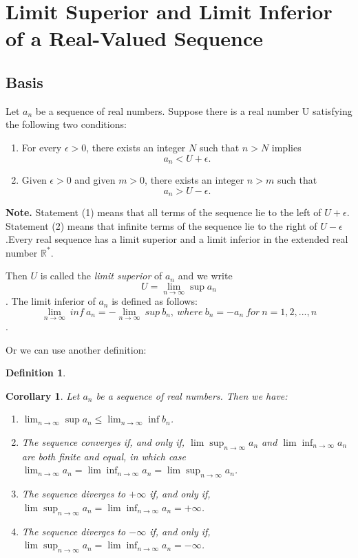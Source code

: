 \documentclass{article}
\newtheorem{corollary}[theorem]{Corollary}
\theoremstyle{definition}
\newtheorem{defi}{Definition}[section]
\begin{document}
\section{Limit Superior and Limit Inferior of a Real-Valued Sequence}
\subsection{Basis}
Let ${a_{n}}$ be a sequence of real numbers. Suppose there is a real number U 
satisfying the following two conditions:

\begin{enumerate}
    \item For every $\epsilon > 0$, there exists an integer $N$ such that $n>N$ 
    implies $$a_{n}<U+\epsilon.$$
    \item Given $\epsilon>0$ and given $m>0$, there exists an integer $n>m$ such that 
    $$a_{n}>U-\epsilon.$$ 
\end{enumerate}

\textbf{Note.} Statement (1) means that all terms of the sequence lie to the left 
of $U+\epsilon$. Statement (2) means that infinite terms of the sequence lie to the 
right of $U-\epsilon$.Every real sequence has a limit superior and a limit inferior 
in the extended real number $\mathbb{R^{*}}$.

Then $U$ is called the \textit{limit superior} of ${a_{n}}$
and we write $$U=\lim_{n\rightarrow \infty}\sup{a_{n}}$$.
The limit inferior of ${a_{n}}$ is defined as follows:
$$\lim_{n\rightarrow \infty}\ inf\ a_{n}=-\lim_{n\rightarrow \infty}\ sup\ b_{n},\ where\ b_{n}=-a_{n}\ for\ n=1,2,...,n$$.

Or we can use another definition:
\begin{defi}


\end{defi}    






\begin{corollary}
Let $a_{n}$ be a sequence of real numbers. Then we have:
\begin{enumerate}
    \item $\lim_{n\rightarrow \infty}\sup a_{n}\leq\lim_{n\rightarrow \infty}\inf b_{n}$.
    \item The sequence converges if, and only if, $\lim\sup_{n\rightarrow \infty}a_{n}$ and 
    $\lim\inf_{n\rightarrow \infty}a_{n}$ are both finite and equal, in which case 
    $\lim_{n\rightarrow \infty}a_{n}=\lim\inf_{n\rightarrow \infty}a_{n}=\lim\sup_{n\rightarrow \infty}a_{n}$.
    \item The sequence diverges to $+\infty$ if, and only if, $\lim\sup_{n\rightarrow \infty}a_{n}=\lim\inf_{n\rightarrow \infty}a_{n}=+\infty$.
    \item The sequence diverges to $-\infty$ if, and only if, $\lim\sup_{n\rightarrow \infty}a_{n}=\lim\inf_{n\rightarrow \infty}a_{n}=-\infty$.
\end{enumerate}
\end{corollary}
\end{document}
